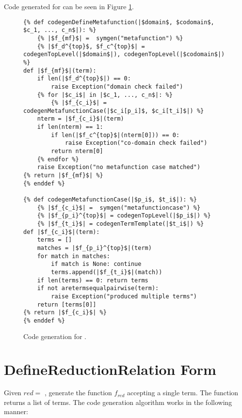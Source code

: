Code generated for \DefineMetafunctionNoArgs \space can be seen in Figure \ref{codegen-define-metafunc}.
\begin{figure}
\begin{verbatim}
{% def codegenDefineMetafunction(|$domain$, $codomain$, $c_1, ..., c_n$|): %}
	{% |$f_{mf}$| =  symgen("metafunction") %}
	{% |$f_d^{top}$, $f_c^{top}$| = codegenTopLevel(|$domain$|), codegenTopLevel(|$codomain$|) %}
def |$f_{mf}$|(term):
	if len(|$f_d^{top}$|) == 0:
		raise Exception("domain check failed")
	{% for |$c_i$| in |$c_1, ..., c_n$|: %}
		{% |$f_{c_i}$| = codegenMetafunctionCase(|$c_i[p_i]$, $c_i[t_i]$|) %}
	nterm = |$f_{c_i}$|(term)
	if len(nterm) == 1:
		if len(|$f_c^{top}$|(nterm[0])) == 0:
			raise Exception("co-domain check failed")
		return nterm[0]
	{% endfor %}
	raise Exception("no metafunction case matched")
{% return |$f_{mf}$| %}
{% enddef %}

{% def codegenMetafunctionCase(|$p_i$, $t_i$|): %}
	{% |$f_{c_i}$| =  symgen("metafunctioncase") %}
	{% |$f_{p_i}^{top}$| = codegenTopLevel(|$p_i$|) %}
	{% |$f_{t_i}$| = codegenTermTemplate(|$t_i$|) %}
def |$f_{c_i}$|(term):
	terms = []
	matches = |$f_{p_i}^{top}$|(term)
	for match in matches:
		if match is None: continue
		terms.append(|$f_{t_i}$|(match))
	if len(terms) == 0: return terms
	if not aretermsequalpairwise(term):
		raise Exception("produced multiple terms")
	return [terms[0]]
{% return |$f_{c_i}$| %}
{% enddef %}
\end{verbatim}
\caption{Code generation for \DefineMetafunctionNoArgs.}
\label{codegen-define-metafunc}
\end{figure}

\section{DefineReductionRelation Form}
Given $red=$ \TlDefineReductionRelation, generate the function $f_{red}$ accepting a single term. The function returns a list of terms. The code generation algorithm works in the following manner:


